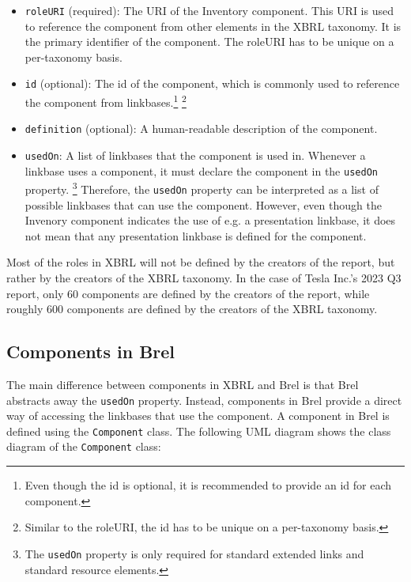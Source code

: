 \begin{itemize}
  \item \texttt{roleURI} (required): The URI of the Inventory component. This URI is used to reference the component from other elements in the XBRL taxonomy. It is the primary identifier of the component. 
  The roleURI has to be unique on a per-taxonomy basis.\cite{xbrl21_custom_roles}
  \item \texttt{id} (optional): The id of the component, which is commonly used to reference the component from linkbases.\footnote[3]{Even though the id is optional, it is recommended to provide an id for each component.\cite{xbrl21_custom_roles}}
  \footnote[4]{Similar to the roleURI, the id has to be unique on a per-taxonomy basis.\cite{xml_id}}
  \item \texttt{definition} (optional): A human-readable description of the component. 
  \item \texttt{usedOn}: A list of linkbases that the component is used in. 
  Whenever a linkbase uses a component, it must declare the component in the \texttt{usedOn} property.
  \footnote[5]{The \texttt{usedOn} property is only required for standard extended links and standard resource elements.\cite{xbrl21_custom_roles}}
  Therefore, the \texttt{usedOn} property can be interpreted as a list of possible linkbases that can use the component.
  However, even though the Invenory component indicates the use of e.g. a presentation linkbase, it does not mean that any presentation linkbase is defined for the component.
\end{itemize}

Most of the roles in XBRL will not be defined by the creators of the report, but rather by the creators of the XBRL taxonomy. 
In the case of Tesla Inc.'s 2023 Q3 report, only 60 components are defined by the creators of the report, while roughly 600 components are defined by the creators of the XBRL taxonomy.\cite{tesla_10q_2023_q3}

\subsection{Components in Brel}

The main difference between components in XBRL and Brel is that Brel abstracts away the \texttt{usedOn} property. 
Instead, components in Brel provide a direct way of accessing the linkbases that use the component. 
A component in Brel is defined using the \texttt{Component} class. 
The following UML diagram shows the class diagram of the \texttt{Component} class:

